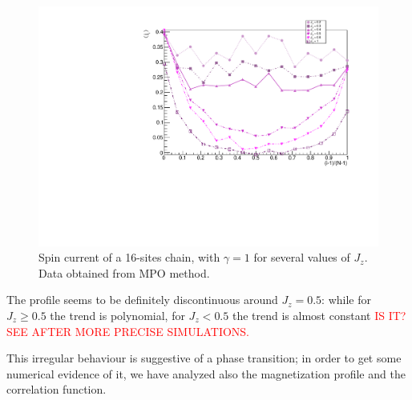 \begin{figure}[H]
    \centering
    \includegraphics[scale=0.7]{Figures/16sites/16sites_SpinCurrVaryingJz.pdf}
    \captionsetup{width=1.\linewidth}
    \caption{Spin current of a 16-sites chain, with $\gamma = 1$ for several values of $J_z$. Data obtained from MPO method.}
    \label{fig:16sites_SpinCurrVaryingJz}
\end{figure}

The profile seems to be definitely discontinuous around $J_z = 0.5$: while for $J_z \geq 0.5$ the trend is polynomial, for $J_z < 0.5$ the trend is almost constant \textcolor{red}{IS IT? SEE AFTER MORE PRECISE SIMULATIONS.}

This irregular behaviour is suggestive of a phase transition; in order to get some numerical evidence of it, we have analyzed also the magnetization profile and the correlation function.




